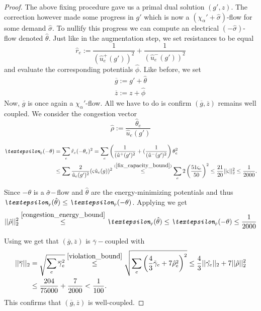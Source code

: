 \begin{proof}
The above fixing procedure gave us a primal dual solution $(g', z)$. The correction however made some progress in $g'$ which is now a $(\chi_\alpha'+\hat{\sigma})$-flow for some demand $\hat{\sigma}$. To nullify this progress we can compute an electrical $(-\hat{\sigma})$-flow denoted $\hat{\theta}$. Just like in the augmentation step, we set resistances to be equal
\[ \hat r_e := \frac{1}{(\hat u_e^+(g'))^2}+\frac{1}{(\hat u_e^-(g'))^2} \]
and evaluate the corresponding potentials $\hat{\phi}$. Like before, we set
\begin{equation}
\begin{split}
\overline{g} := g'+\hat{\theta} \\
\overline{z} := z+\hat{\phi}
\end{split}
\end{equation}
Now, $\overline{g}$ is once again a $\chi_\alpha'$-flow. All we have to do is confirm $(\overline{g}, \overline{z})$ remains well coupled.
We consider the congestion vector
\[ \hat{\rho} := \frac{\hat{\theta}_e}{\hat u_e(g')} \]

\begin{equation}
\begin{split}
\emph{\textepsilon}_{\hat r}(-\theta)
&= \sum_e\hat r_e(-\theta_e)^2
= \sum_e\left(\frac{1}{(\hat u^+(g')^2}+(\frac{1}{(\hat u^-(g')^2}\right)\theta_e^2 \\
&\le \sum \frac{2}{\hat u_e(g')^2}(\varsigma\hat u_e(g))^2
\stackrel{(\ref{fix_capacity_bound})}{\le} \sum_e2\left(\frac{51\varsigma_e}{50}\right)^2
\le \frac{21}{20}||\varsigma||_2^2
\le \frac{1}{2000}.
\end{split}
\end{equation}

Since $-\theta$ is a $\-\hat{\sigma}-$flow and $\hat{\theta}$ are the energy-minimizing potentials and thus $ \emph{\textepsilon}_{\hat r}(\hat{\theta}) \le \emph{\textepsilon}_{\hat r}(-\theta) $.
Applying  we get
\[ ||\hat{\rho}||_2^2 \stackrel{\ref{congestion_energy_bound}}{\le} \emph{\textepsilon}_{\hat r}(\hat{\theta}) \le \emph{\textepsilon}_{\hat r}(-\theta) \le \frac{1}{2000} \]

Using  we get that $(\overline{g},\overline{z})$ is $\overline{\gamma}-$coupled with
\begin{equation}
\begin{split}
||\overline{\gamma}||_2
    & = \sqrt{\sum_e\overline{\gamma}_e^2}\stackrel{\ref{violation_bound}}{\le} \sqrt{\sum_e\left(\frac{4}{3}\tilde{\gamma}_e+7\hat{\rho}_e^2\right)^2}
      \le \frac{4}{3}||\hat{\gamma_e}||_2+7||\hat{\rho}||_2^2 \\
    & \le \frac{204}{75000}+\frac{7}{2000} < \frac{1}{100}.
\end{split}
\end{equation}
This confirms that $(\overline{g},\overline{z})$ is well-coupled.
\end{proof}

